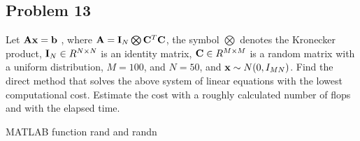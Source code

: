 \subsection{Problem 13}

Let $\mathbf{A}\mathbf{x} = \mathbf{b}$ , where $\mathbf{A} = \mathbf{I}_N \bigotimes \mathbf{C}^T\mathbf{C}$, the symbol $\bigotimes$ denotes the Kronecker product,
$\mathbf{I}_N \in R^{N \times N}$ is an identity matrix, $\mathbf{C} \in R^{M \times M}$ is a random matrix with a uniform distribution,
$M = 100$, and $N=50$, and $\mathbf{x} \sim N(0, I_{MN})$.
Find the direct method that solves the above system of linear equations with the lowest computational cost.
Estimate the cost with a roughly calculated number of flops and with the elapsed time.

MATLAB function rand and randn
